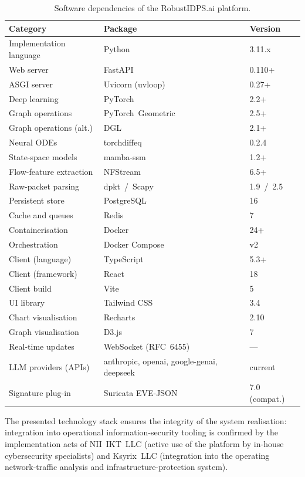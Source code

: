\begin{table}[H]
\centering
\caption{Software dependencies of the RobustIDPS.ai platform.}
\label{tab:packages_versions}
\small
\renewcommand{\arraystretch}{0.92}\begin{tabular}{@{}lll@{}}
\toprule
\textbf{Category} & \textbf{Package} & \textbf{Version} \\
\midrule
Implementation language & Python & 3.11.x \\
Web server & FastAPI & 0.110+ \\
ASGI server & Uvicorn (uvloop) & 0.27+ \\
Deep learning & PyTorch & 2.2+ \\
Graph operations & PyTorch~Geometric & 2.5+ \\
Graph operations (alt.) & DGL & 2.1+ \\
Neural ODEs & torchdiffeq & 0.2.4 \\
State-space models & mamba-ssm & 1.2+ \\
Flow-feature extraction & NFStream & 6.5+ \\
Raw-packet parsing & dpkt~/~Scapy & 1.9~/~2.5 \\
Persistent store & PostgreSQL & 16 \\
Cache and queues & Redis & 7 \\
Containerisation & Docker & 24+ \\
Orchestration & Docker Compose & v2 \\
Client (language) & TypeScript & 5.3+ \\
Client (framework) & React & 18 \\
Client build & Vite & 5 \\
UI library & Tailwind CSS & 3.4 \\
Chart visualisation & Recharts & 2.10 \\
Graph visualisation & D3.js & 7 \\
Real-time updates & WebSocket (RFC~6455) & --- \\
LLM providers (APIs) & anthropic, openai, google-genai, deepseek & current \\
Signature plug-in & Suricata EVE-JSON & 7.0 (compat.) \\
\bottomrule
\end{tabular}
\end{table}

The presented technology stack ensures the integrity of the system realisation: integration into operational information-security tooling is confirmed by the implementation acts of NII~IKT~LLC (active use of the platform by in-house cybersecurity specialists) and Ksyrix~LLC (integration into the operating network-traffic analysis and infrastructure-protection system).

